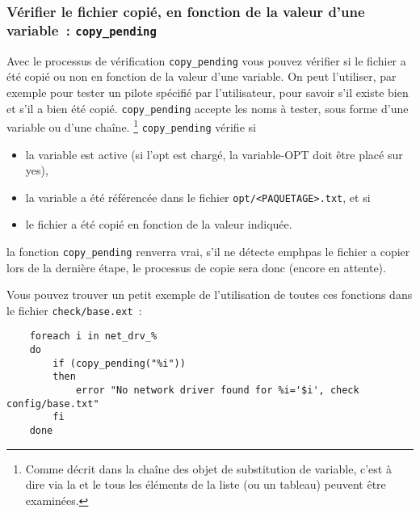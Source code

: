 \subsubsection{Vérifier le fichier copié, en fonction de la valeur d'une variable~:
    \texttt{copy\_pending}}

        Avec le processus de vérification \texttt{copy\_pending} vous pouvez vérifier
        si le fichier a été copié ou non en fonction de la valeur d'une variable.
        On peut l’utiliser, par exemple pour tester un pilote spécifié par
        l'utilisateur, pour savoir s’il existe bien et s’il a bien été copié.
        \texttt{copy\_pending} accepte les noms à tester, sous forme d'une variable ou
        d'une chaîne. \footnote{Comme décrit dans la chaîne des objet de substitution de variable,
		c'est à dire via la  et le
		 tous les éléments
		de la liste (ou un tableau) peuvent être examinées.} \texttt{copy\_pending} vérifie si

        \begin{itemize}
        \item la variable est active (si l'opt est chargé, la variable-OPT doit
           être placé sur \og{}yes\fg{}),

         \item la variable a été référencée dans le fichier \texttt{opt/<PAQUETAGE>.txt}, et si

         \item le fichier a été copié en fonction de la valeur indiquée.
        \end{itemize}

        la fonction \texttt{copy\_pending} renverra \og{}vrai\fg{}, s'il ne détecte emph{pas}
		le fichier a copier lors de la dernière étape, le processus de copie sera donc
		(encore en \og{}attente\fg{}).

    Vous pouvez trouver un petit exemple de l'utilisation de toutes ces
    fonctions dans le fichier \texttt{check/base.ext}~:

\begin{example}
\begin{verbatim}
    foreach i in net_drv_%
    do
        if (copy_pending("%i"))
        then
            error "No network driver found for %i='$i', check config/base.txt"
        fi
    done
\end{verbatim}
\end{example}


